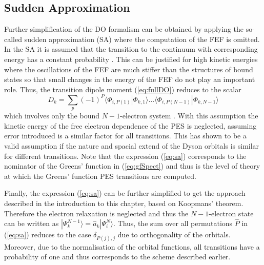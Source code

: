 \subsection{Sudden Approximation}
\label{ch:sa}
Further simplification of the DO formalism can be obtained by applying the so-called sudden approximation (SA) where the computation of the FEF is omitted.
In the SA it is assumed that the transition to the continuum with corresponding energy has a constant probability \cite{saGonzales}.
This can be justified for high kinetic energies where the oscillations of the FEF are much stiffer than the structures of bound states so that small changes in the energy of the FEF do not play an important role.
Thus, the transition dipole moment (\ref{eq:fullDO}) reduces to the scalar
\begin{equation} \label{eq:sa}
D_k= \sum_p (-1)^P \langle \Phi_{i,P(1)}  |\Phi_{k,1} \rangle
           \hdots  \langle \Phi_{i,P(N-1)}|\Phi_{k,N-1} \rangle
\end{equation}
which involves only the bound $N-1$-electron system \cite{saAberg}.
With this assumption the kinetic energy of the free electron dependence of the PES is neglected, assuming error introduced is a similar factor for all transitions.
This has shown to be a valid assumption if the nature and spacial extend of the Dyson orbitals is similar for different transitions.
Note that the expression (\ref{eq:sa}) corresponds to the nominator of the Greens' function in (\ref{eq:gfSpect}) and thus is the level of theory at which the Greens' function PES transitions are computed.

Finally, the expression (\ref{eq:sa}) can be further simplified to get the approach described in the introduction to this chapter, based on Koopmans' theorem.
Therefore the electron relaxation is neglected and thus the $N-1$-electron state can be written as $|\Psi_{k}^{N-1}\rangle= \hat{a}_k|\Psi_i^N\rangle$. 
Thus, the sum over all permutations $\hat{P}$ in (\ref{eq:sa}) reduces to the case $\delta_{P(j),j}$ due to orthogonality of the orbitals.
Moreover, due to the normalisation of the orbital functions, all transitions have a probability of one and thus corresponds to the scheme described earlier.

